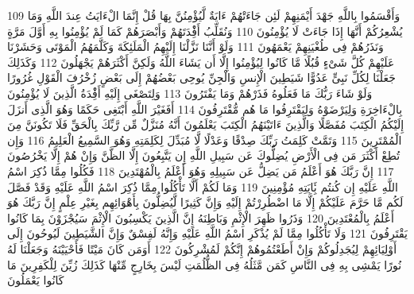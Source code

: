 {\tiny\colorbox{cl_aya}{109}} وَأَقْسَمُوا بِاللَّهِ جَهْدَ أَيْمَنِهِمْ لَئِن جَاءَتْهُمْ ءَايَةٌ لَّيُؤْمِنُنَّ بِهَا قُلْ إِنَّمَا الْءَايَتُ عِندَ اللَّهِ وَمَا يُشْعِرُكُمْ أَنَّهَا إِذَا جَاءَتْ لَا يُؤْمِنُونَ
{\tiny\colorbox{cl_aya}{110}} وَنُقَلِّبُ أَفِْٔدَتَهُمْ وَأَبْصَرَهُمْ كَمَا لَمْ يُؤْمِنُوا بِهِ أَوَّلَ مَرَّةٍ وَنَذَرُهُمْ فِى طُغْيَنِهِمْ يَعْمَهُونَ
{\tiny\colorbox{cl_aya}{111}} وَلَوْ أَنَّنَا نَزَّلْنَا إِلَيْهِمُ الْمَلَئِكَةَ وَكَلَّمَهُمُ الْمَوْتَى وَحَشَرْنَا عَلَيْهِمْ كُلَّ شَىْءٍ قُبُلًا مَّا كَانُوا لِيُؤْمِنُوا إِلَّا أَن يَشَاءَ اللَّهُ وَلَكِنَّ أَكْثَرَهُمْ يَجْهَلُونَ
{\tiny\colorbox{cl_aya}{112}} وَكَذَلِكَ جَعَلْنَا لِكُلِّ نَبِىٍّ عَدُوًّا شَيَطِينَ الْإِنسِ وَالْجِنِّ يُوحِى بَعْضُهُمْ إِلَى بَعْضٍ زُخْرُفَ الْقَوْلِ غُرُورًا وَلَوْ شَاءَ رَبُّكَ مَا فَعَلُوهُ فَذَرْهُمْ وَمَا يَفْتَرُونَ
{\tiny\colorbox{cl_aya}{113}} وَلِتَصْغَى إِلَيْهِ أَفِْٔدَةُ الَّذِينَ لَا يُؤْمِنُونَ بِالْءَاخِرَةِ وَلِيَرْضَوْهُ وَلِيَقْتَرِفُوا مَا هُم مُّقْتَرِفُونَ
{\tiny\colorbox{cl_aya}{114}} أَفَغَيْرَ اللَّهِ أَبْتَغِى حَكَمًا وَهُوَ الَّذِى أَنزَلَ إِلَيْكُمُ الْكِتَبَ مُفَصَّلًا وَالَّذِينَ ءَاتَيْنَهُمُ الْكِتَبَ يَعْلَمُونَ أَنَّهُ مُنَزَّلٌ مِّن رَّبِّكَ بِالْحَقِّ فَلَا تَكُونَنَّ مِنَ الْمُمْتَرِينَ
{\tiny\colorbox{cl_aya}{115}} وَتَمَّتْ كَلِمَتُ رَبِّكَ صِدْقًا وَعَدْلًا لَّا مُبَدِّلَ لِكَلِمَتِهِ وَهُوَ السَّمِيعُ الْعَلِيمُ
{\tiny\colorbox{cl_aya}{116}} وَإِن تُطِعْ أَكْثَرَ مَن فِى الْأَرْضِ يُضِلُّوكَ عَن سَبِيلِ اللَّهِ إِن يَتَّبِعُونَ إِلَّا الظَّنَّ وَإِنْ هُمْ إِلَّا يَخْرُصُونَ
{\tiny\colorbox{cl_aya}{117}} إِنَّ رَبَّكَ هُوَ أَعْلَمُ مَن يَضِلُّ عَن سَبِيلِهِ وَهُوَ أَعْلَمُ بِالْمُهْتَدِينَ
{\tiny\colorbox{cl_aya}{118}} فَكُلُوا مِمَّا ذُكِرَ اسْمُ اللَّهِ عَلَيْهِ إِن كُنتُم بَِٔايَتِهِ مُؤْمِنِينَ
{\tiny\colorbox{cl_aya}{119}} وَمَا لَكُمْ أَلَّا تَأْكُلُوا مِمَّا ذُكِرَ اسْمُ اللَّهِ عَلَيْهِ وَقَدْ فَصَّلَ لَكُم مَّا حَرَّمَ عَلَيْكُمْ إِلَّا مَا اضْطُرِرْتُمْ إِلَيْهِ وَإِنَّ كَثِيرًا لَّيُضِلُّونَ بِأَهْوَائِهِم بِغَيْرِ عِلْمٍ إِنَّ رَبَّكَ هُوَ أَعْلَمُ بِالْمُعْتَدِينَ
{\tiny\colorbox{cl_aya}{120}} وَذَرُوا ظَهِرَ الْإِثْمِ وَبَاطِنَهُ إِنَّ الَّذِينَ يَكْسِبُونَ الْإِثْمَ سَيُجْزَوْنَ بِمَا كَانُوا يَقْتَرِفُونَ
{\tiny\colorbox{cl_aya}{121}} وَلَا تَأْكُلُوا مِمَّا لَمْ يُذْكَرِ اسْمُ اللَّهِ عَلَيْهِ وَإِنَّهُ لَفِسْقٌ وَإِنَّ الشَّيَطِينَ لَيُوحُونَ إِلَى أَوْلِيَائِهِمْ لِيُجَدِلُوكُمْ وَإِنْ أَطَعْتُمُوهُمْ إِنَّكُمْ لَمُشْرِكُونَ
{\tiny\colorbox{cl_aya}{122}} أَوَمَن كَانَ مَيْتًا فَأَحْيَيْنَهُ وَجَعَلْنَا لَهُ نُورًا يَمْشِى بِهِ فِى النَّاسِ كَمَن مَّثَلُهُ فِى الظُّلُمَتِ لَيْسَ بِخَارِجٍ مِّنْهَا كَذَلِكَ زُيِّنَ لِلْكَفِرِينَ مَا كَانُوا يَعْمَلُونَ
